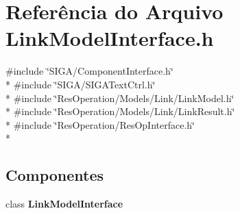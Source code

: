 \section{Referência do Arquivo Link\+Model\+Interface.\+h}
\label{_link_model_interface_8h}
{\ttfamily \#include \char`\"{}S\+I\+G\+A/\+Component\+Interface.\+h\char`\"{}}\\*
{\ttfamily \#include \char`\"{}S\+I\+G\+A/\+S\+I\+G\+A\+Text\+Ctrl.\+h\char`\"{}}\\*
{\ttfamily \#include \char`\"{}Res\+Operation/\+Models/\+Link/\+Link\+Model.\+h\char`\"{}}\\*
{\ttfamily \#include \char`\"{}Res\+Operation/\+Models/\+Link/\+Link\+Result.\+h\char`\"{}}\\*
{\ttfamily \#include \char`\"{}Res\+Operation/\+Res\+Op\+Interface.\+h\char`\"{}}\\*
\subsection*{Componentes}
\begin{DoxyCompactItemize}
\item 
class {\bf Link\+Model\+Interface}
\end{DoxyCompactItemize}
